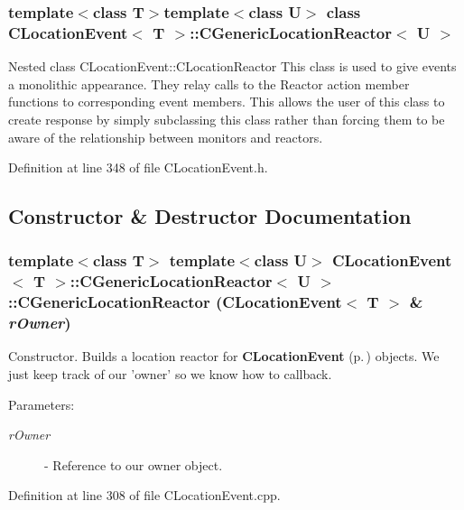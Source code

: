 \subsubsection*{template$<$class T$>$template$<$class U$>$ class CLocation\-Event$<$ T $>$::CGeneric\-Location\-Reactor$<$ U $>$}

Nested class CLocation\-Event::CLocation\-Reactor This class is used to give events a monolithic appearance. They relay calls to the Reactor action member functions to corresponding event members. This allows the user of this class to create response by simply subclassing this class rather than forcing them to be aware of the relationship between monitors and reactors. 



Definition at line 348 of file CLocation\-Event.h.

\subsection{Constructor \& Destructor Documentation}
\subsubsection{\setlength{\rightskip}{0pt plus 5cm}template$<$class T$>$ template$<$class U$>$ {\bf CLocation\-Event}$<$ T $>$::CGeneric\-Location\-Reactor$<$ U $>$::CGeneric\-Location\-Reactor ({\bf CLocation\-Event}$<$ T $>$ \& {\em r\-Owner})}\label{classCLocationEvent_1_1CGenericLocationReactor_a0}


Constructor. Builds a location reactor for {\bf CLocation\-Event} {\rm (p.\,\pageref{classCLocationEvent})} objects. We just keep track of our 'owner' so we know how to callback.\begin{Desc}
\item[Parameters: ]\par
\begin{description}
\item[{\em 
r\-Owner}]- Reference to our owner object. \end{description}
\end{Desc}


Definition at line 308 of file CLocation\-Event.cpp.

